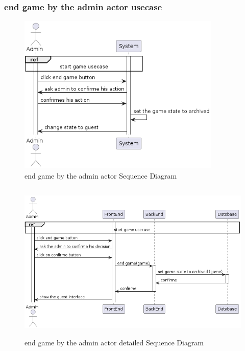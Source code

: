 \documentclass{article}
\begin{document}
\subsubsection{end game by the admin actor usecase}
 \begin{figure}[H]
	 \centering
	 \includegraphics[height=3in]{../thesis_tex/assets/diagrams/admin_end_game_SD.png}
	 \caption{end game by the admin actor Sequence Diagram}
\end{figure}

 \begin{figure}[H]
	 \centering
	 \includegraphics[height=3in]{../thesis_tex/assets/diagrams/admin_end_game_detailedSD.png}
	 \caption{end game by the admin actor detailed Sequence Diagram}
\end{figure}
\end{document}
